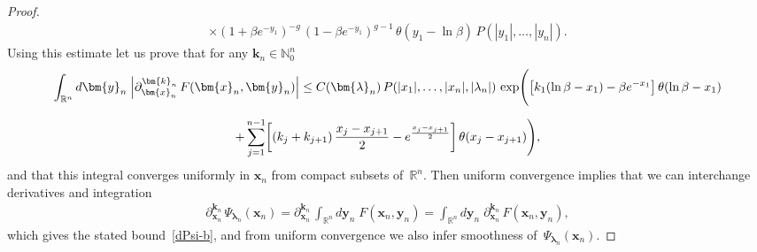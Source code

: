 \documentclass[11pt]{article}
\numberwithin{equation}{section}
\theoremstyle{plain}
\theoremstyle{definition}
\begin{document}
\begin{proof}
\begin{multline}
		\times (1 + \beta e^{-y_1})^{- g} \, (1 - \beta e^{-y_1})^{g - 1} \, \theta(y_1 - \ln \beta) \, P(|y_1|, \dots, |y_n|).
	\end{multline}
	Using this estimate let us prove that for any $\bm{k}_n \in \mathbb{N}_0^n$
	\begin{multline} \label{dF-b2}
			\int_{\mathbb{R}^n} d\bm{y}_n \; \Bigl| \partial_{\bm{x}_n}^{\bm{k}_n} \, F (\bm{x}_n, \bm{y}_n) \Bigr| \leq C(\bm{\lambda}_n) \, P(|x_1|, \dots, |x_n|, |\lambda_n|) \, \exp\Biggl(  \bigl[ k_1 (\ln \beta - x_1) - \beta e^{-x_1} \bigr] \, \theta(\ln \beta - x_1) \\[6pt]
			+ \sum_{j = 1}^{n - 1} \biggl[ (k_j + k_{j + 1}) \, \frac{x_j - x_{j + 1}}{2} -  e^{ \frac{x_j - x_{j + 1} }{2} } \biggr] \, \theta(x_j - x_{j + 1} ) \Biggr),
	\end{multline}
	and that this integral converges uniformly in $\bm{x}_n$ from compact subsets of~$\mathbb{R}^n$. Then uniform convergence implies that we can interchange derivatives and integration
	\begin{align}
			\partial_{\bm{x}_n}^{\bm{k}_n} \, \Psi_{\bm{\lambda}_n}(\bm{x}_n) = \partial_{\bm{x}_n}^{\bm{k}_n} \, \int_{\mathbb{R}^{n}} d\bm{y}_{n} \;  F(\bm{x}_n, \bm{y}_{n}) = \int_{\mathbb{R}^{n}} d\bm{y}_{n} \;  \partial_{\bm{x}_n}^{\bm{k}_n} \, F(\bm{x}_n, \bm{y}_{n}),
	\end{align}
	which gives the stated bound~\eqref{dPsi-b}, and from uniform convergence we also infer smoothness of~$\Psi_{\bm{\lambda}_n}(\bm{x}_n)$.
	

\end{proof}
\end{document}
